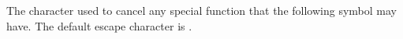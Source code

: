 \item[Escape character]{
The character used to cancel any special function
that the following symbol may have.  
The default escape character  is \bxshell{$\backslash$}.
}
